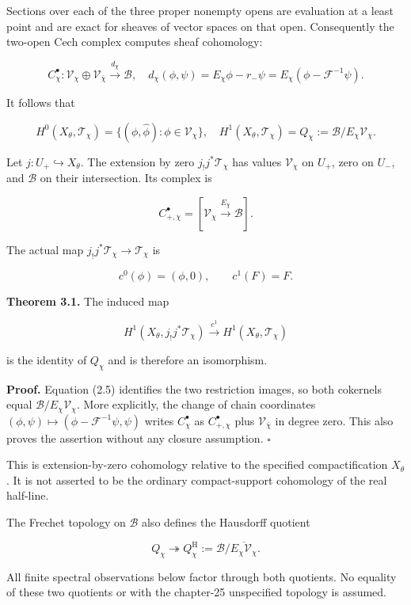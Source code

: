 \documentclass[
]{article}
\begin{document}
Sections over each of the three proper nonempty opens are evaluation at
a least point and are exact for sheaves of vector spaces on that open.
Consequently the two-open Cech complex computes sheaf cohomology:

\[
C_\chi^\bullet:
\mathscr V_\chi\oplus\mathscr V_{\bar\chi}
\xrightarrow{d_\chi}\mathscr B,
\quad d_\chi(\phi,\psi)=E_\chi\phi-r_-\psi
=E_\chi(\phi-\mathcal F^{-1}\psi). \tag{3.1}
\]

It follows that

\[
H^0(X_\theta,\mathcal T_\chi)=\{(\phi,\widehat\phi):\phi\in\mathscr V_\chi\},
\quad H^1(X_\theta,\mathcal T_\chi)=Q_\chi:=\mathscr B/E_\chi\mathscr V_\chi. \tag{3.2}
\]

Let \(j:U_+\hookrightarrow X_\theta\). The extension by zero
\(j_!j^*\mathcal T_\chi\) has values \(\mathscr V_\chi\) on \(U_+\),
zero on \(U_-\), and \(\mathscr B\) on their intersection. Its complex
is

\[
C_{+,\chi}^\bullet=[\mathscr V_\chi\xrightarrow{E_\chi}\mathscr B].
\]

The actual map \(j_!j^*\mathcal T_\chi\to\mathcal T_\chi\) is

\[
c^0(\phi)=(\phi,0),\qquad c^1(F)=F. \tag{3.3}
\]

\textbf{Theorem 3.1.} The induced map

\[
H^1(X_\theta,j_!j^*\mathcal T_\chi)\xrightarrow{c^1}H^1(X_\theta,\mathcal T_\chi)
\]

is the identity of \(Q_\chi\) and is therefore an isomorphism.

\textbf{Proof.} Equation (2.5) identifies the two restriction images, so
both cokernels equal \(\mathscr B/E_\chi\mathscr V_\chi\). More
explicitly, the change of chain coordinates
\((\phi,\psi)\mapsto(\phi-\mathcal F^{-1}\psi,\psi)\) writes
\(C_\chi^\bullet\) as \(C_{+,\chi}^\bullet\) plus
\(\mathscr V_{\bar\chi}\) in degree zero. This also proves the assertion
without any closure assumption. \(\square\)

This is extension-by-zero cohomology relative to the specified
compactification \(X_\theta\). It is not asserted to be the ordinary
compact-support cohomology of the real half-line.

The Frechet topology on \(\mathscr B\) also defines the Hausdorff
quotient

\[
Q_\chi\twoheadrightarrow Q_\chi^{\mathrm{H}}:=\mathscr B/\overline{E_\chi\mathscr V_\chi}.
\]

All finite spectral observations below factor through both quotients. No
equality of these two quotients or with the chapter-25 unspecified
topology is assumed.
\end{document}
